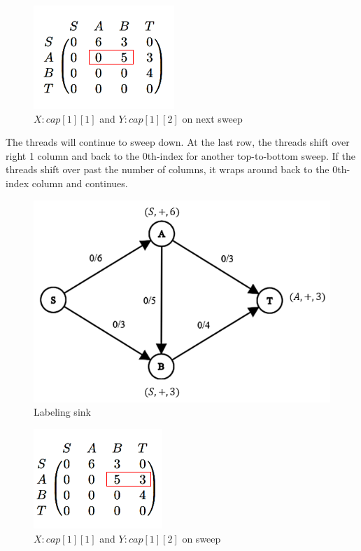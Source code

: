         \begin{figure}[H]
            \centering
            \includegraphics[scale=.7]{figures/Sweep2.png}
            \caption{$X:cap[1][1]$ and $Y:cap[1][2]$ on next sweep}
            \label{fig:Sweep}
        \end{figure}
        
        The threads will continue to sweep down. At the last row, the threads shift over right 1 column and back to the 0th-index for another top-to-bottom sweep. If the threads shift over past the number of columns, it wraps around back to the 0th-index column and continues.

        \begin{figure}[H]
            \centering
            \includegraphics[scale=.6]{figures/hitsink.png}
            \caption{Labeling sink}
            \label{fig:Sweep}
        \end{figure}
        
        \begin{figure}[H]
            \centering
            \includegraphics[scale=.7]{figures/cap[1][3].png}
            \caption{$X:cap[1][1]$ and $Y:cap[1][2]$ on sweep}
            \label{fig:Sweep}
        \end{figure}
        
